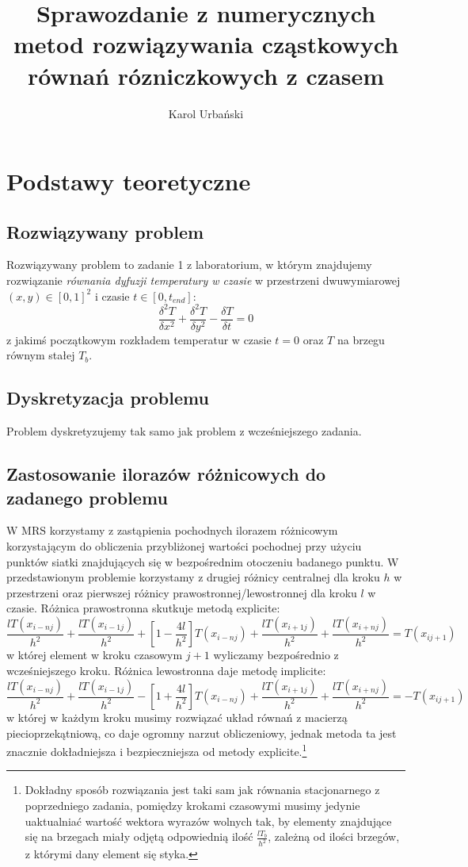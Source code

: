 \documentclass{article}
\title{Sprawozdanie z numerycznych metod rozwiązywania cząstkowych równań rózniczkowych z czasem}
\author{Karol Urbański}
\begin{document}
\maketitle
\section{Podstawy teoretyczne}
\subsection{Rozwiązywany problem}
Rozwiązywany problem to zadanie 1 z laboratorium, w którym znajdujemy rozwiązanie \emph{równania dyfuzji temperatury w czasie} 
w przestrzeni dwuwymiarowej $(x,y)\in [0,1]^2$ i czasie $t\in [0,t_{end}]$:
	\begin{equation}
		\frac{\delta^2 T}{\delta x^2}
			+
		\frac{\delta^2 T}{\delta y^2}
			-
		\frac{\delta T}{\delta t}
			=
		0
	\label{base}
	\end{equation}
z jakimś początkowym rozkładem temperatur w czasie $t=0$ oraz $T$ na brzegu równym stałej $T_{b}$.
\subsection{Dyskretyzacja problemu}
Problem dyskretyzujemy tak samo jak problem z wcześniejszego zadania.
\subsection{Zastosowanie ilorazów różnicowych do zadanego problemu}
W MRS korzystamy z zastąpienia pochodnych ilorazem różnicowym korzystającym do obliczenia przybliżonej
wartości pochodnej przy użyciu punktów siatki znajdujących się w bezpośrednim otoczeniu badanego punktu.
W przedstawionym problemie korzystamy z drugiej różnicy centralnej dla kroku $h$ w przestrzeni oraz pierwszej różnicy prawostronnej/lewostronnej
dla kroku $l$ w czasie. Różnica prawostronna skutkuje metodą explicite:
\begin{equation*}
	\frac{lT(x_{i-nj})}{h^2} + \frac{lT(x_{i-1j})}{h^2} + \left[1-\frac{4l}{h^2}\right]T(x_{i-nj}) + \frac{lT(x_{i+1j})}{h^2} +\frac{lT(x_{i+nj})}{h^2} = T(x_{ij+1})
\end{equation*}
w której element w kroku czasowym $j+1$ wyliczamy bezpośrednio z wcześniejszego kroku.
Różnica lewostronna daje metodę implicite:
\begin{equation*}
	\frac{lT(x_{i-nj})}{h^2} + \frac{lT(x_{i-1j})}{h^2} - \left[1+\frac{4l}{h^2}\right]T(x_{i-nj}) + \frac{lT(x_{i+1j})}{h^2} +\frac{lT(x_{i+nj})}{h^2} = -T(x_{ij+1})
\end{equation*}
w której w każdym kroku musimy rozwiązać układ równań z macierzą piecioprzekątniową, co daje ogromny narzut obliczeniowy, jednak metoda ta jest znacznie dokładniejsza
i bezpieczniejsza od metody explicite.\footnote{Dokładny sposób rozwiązania jest taki sam jak równania stacjonarnego z poprzedniego zadania, pomiędzy krokami czasowymi
musimy jedynie uaktualniać wartość wektora wyrazów wolnych tak, by elementy znajdujące się na brzegach miały odjętą odpowiednią ilość $\frac{lT_b}{h^2}$, zależną od ilości brzegów, z którymi
dany element się styka.}
\end{document}
